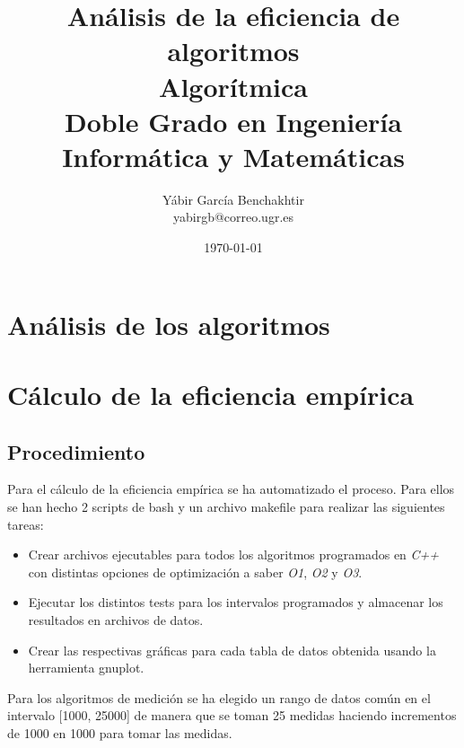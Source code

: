 \documentclass{article}
\begin{document}
\title{%
  \huge Análisis de la eficiencia de algoritmos \\[5mm]
  \Large Algorítmica\\
  \normalsize Doble Grado en Ingeniería Informática y Matemáticas\\[5cm]
}
\author{Yábir García Benchakhtir \\ yabirgb@correo.ugr.es \\[10cm]}

\date{\today}
\maketitle

\newpage
\tableofcontents
\newpage

\section{Análisis de los algoritmos}

\section{Cálculo de la eficiencia empírica}

\subsection{Procedimiento}

Para el cálculo de la eficiencia empírica se ha automatizado el
proceso. Para ellos se han hecho 2 scripts de bash y un archivo
makefile para realizar las siguientes tareas:

\begin{itemize}
\item Crear archivos ejecutables para todos los algoritmos programados en \textit{C++} con distintas opciones de optimización a saber \textit{O1}, \textit{O2} y \textit{O3}.
\item Ejecutar los distintos tests para los intervalos programados y
  almacenar los resultados en archivos de datos.
\item Crear las respectivas gráficas para cada tabla de datos obtenida usando la herramienta gnuplot.
\end{itemize}

Para los algoritmos de medición se ha elegido un rango de datos común
en el intervalo [1000, 25000] de manera que se toman 25 medidas
haciendo incrementos de 1000 en 1000 para tomar las medidas.
\end{document}
